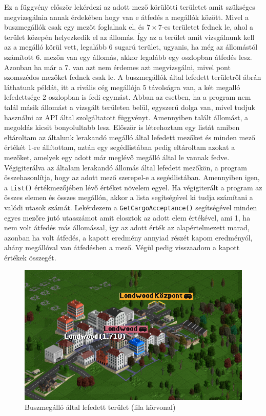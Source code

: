Ez a függvény először lekérdezi az adott mező körülötti területet amit szükséges megvizsgálnia annak érdekében hogy van e átfedés a megállók között. Mivel a buszmegállók csak egy mezőt foglalnak el, és $7 \times 7$-es területet fednek le, ahol a terület közepén helyezkedik el az állomás. Így az a terület amit vizsgálnunk kell az a megálló körül vett, legalább 6 sugarú terület, ugyanis, ha még az állomástól számított 6. mezőn van egy állomás, akkor legalább egy oszlopban átfedés lesz. Azonban ha már a 7. van azt nem érdemes azt megvizsgálni, mivel pont szomszédos mezőket fednek csak le. A buszmegállók által lefedett területről  ábrán láthatunk példát, itt a rivális cég megállója 5 távolságra van, a két megalló lefedettsége 2 oszlopban is fedi egymást. Abban az esetben, ha a program nem talál másik állomást a vizsgált területen belül, egyszerű dolga van, mivel tudjuk használni az API által szolgáltatott függvényt. Amennyiben talált állomást, a megoldás kicsit bonyolultabb lesz. Először is létrehoztam egy listát amiben eltároltam az általunk lerakandó megálló által lefedett mezőket és minden mező értékét 1-re állítottam, aztán egy segédlistában pedig eltároltam azokat a mezőket, amelyek egy adott már meglévő megálló által le vannak fedve. Végigiterálva az általam lerakandó állomás által lefedett mezőkön, a program összehasonlítja, hogy az adott mező szerepel-e a segédlistában. Amennyiben igen, a \texttt{List()} értékmezőjében lévő értéket növelem egyel. Ha végigiterált a program az összes elemen és összes megállón, akkor a lista segítségével ki tudja számítani a valódi utasok számát. Lekérdezem a \texttt{GetCargoAcceptance()} segítségével minden egyes mezőre jutó utasszámot amit elosztok az adott elem értékével, ami 1, ha nem volt átfedés más állomással, így az adott érték az alapértelmezett marad, azonban ha volt átfedés, a kapott eredmény annyiad részét kapom eredményól, ahány megállóval van átfedésben a mező. Végül pedig visszaadom a kapott értékek összegét.

\begin{figure} [b!]
	\centering
	\includegraphics[scale=0.8]{images/megallo.png}
	\caption{Buszmegálló által lefedett terület (lila körvonal)}
	\label{fig:megallo}
\end{figure}

